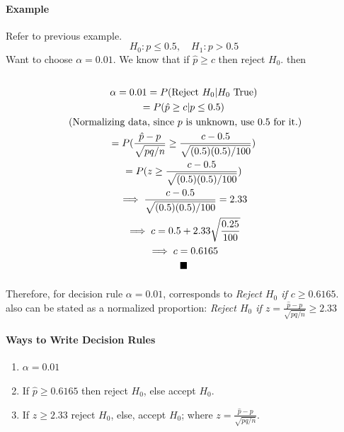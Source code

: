 \documentclass{article}
\begin{document}
			\paragraph{Example} Refer to previous example.
			\[
				H_0: p \leq 0.5,\quad 
				H_1: p > 0.5
			\]
			Want to choose $\alpha = 0.01$. We know that if $\hat{p} \geq c$ then reject $H_0$. then
			\begin{multline*}
				\\
				\alpha = 0.01 = P(\text{{Reject }}H_0 | H_0 \text{{ True}}) \\
				= P(\hat{p} \geq c | p \leq 0.5) \\
				 \text{{ (Normalizing data, since $p$ is unknown, use 0.5 for it.)}} \\
				= P(\frac{\hat{p} - p}{\sqrt{pq/n}} \geq \frac{c - 0.5}{\sqrt{(0.5)(0.5)/100}})\\
				= P(z \geq \frac{c - 0.5}{\sqrt{(0.5)(0.5)/100}}) \\
				\implies \frac{c - 0.5}{\sqrt{(0.5)(0.5)/100}} = 2.33 \\
				\implies c = 0.5 + 2.33 \sqrt{\frac{0.25}{100}}\\
				\implies c = 0.6165 \\
				\blacksquare
			\end{multline*}
			\paragraph{} Therefore, for decision rule $\alpha = 0.01$, corresponds to \emph{Reject $H_0$ if $c \geq 0.6165$}.
			\\ also can be stated as a normalized proportion: \emph{Reject $H_0$ if $z = \frac{\hat{p} - p}{\sqrt{pq/n}} \geq 2.33$}
			
			\paragraph{Ways to Write Decision Rules}
			\begin{enumerate}
				\item {} $\alpha = 0.01$
				\item {} If $\hat{p} \geq 0.6165$ then reject $H_0$, else accept $H_0$.
				\item {} If $z \geq 2.33$ reject $H_0$, else, accept $H_0$; where $z = \frac{\hat{p} - p}{\sqrt{pq/n}}$.
			\end{enumerate}
			
\end{document}
